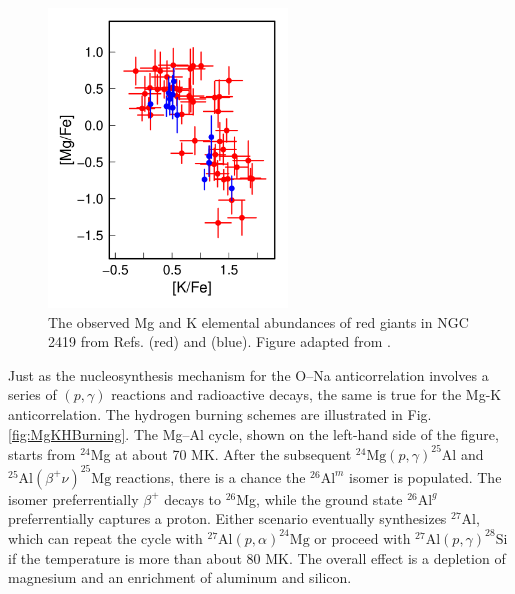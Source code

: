\begin{figure}[t]
\centering
\includegraphics[width=2.5in]{Chapter-6/figs/MgK_Observation.png}
\caption{\label{fig:MgK}The observed Mg and K elemental abundances of red giants in NGC 2419 from Refs. \cite{Mucciarelli2012} (red) and \cite{Cohen2012} (blue). Figure adapted from \cite{Iliadis2016}.}
\end{figure}


Just as the nucleosynthesis mechanism for the O--Na anticorrelation involves a series of $(p,\gamma)$ reactions and radioactive decays, the same is true for the Mg-K anticorrelation. The hydrogen burning schemes are illustrated in Fig. \ref{fig:MgKHBurning}. The Mg--Al cycle, shown on the left-hand side of the figure, starts from $^{24}$Mg at about 70 MK. After the subsequent $^{24}\mathrm{Mg}(p,\gamma)^{25}\mathrm{Al}$ and $^{25}\mathrm{Al}(\beta^{+}\nu)^{25}\mathrm{Mg}$ reactions, there is a chance the $^{26}\mathrm{Al}^{m}$ isomer is populated. The isomer preferrentially $\beta^{+}$ decays to $^{26}$Mg, while the ground state $^{26}\mathrm{Al}^{g}$ preferrentially captures a proton. Either scenario eventually synthesizes $^{27}$Al, which can repeat the cycle with $^{27}\mathrm{Al}(p,\alpha)^{24}\mathrm{Mg}$ or proceed with $^{27}\mathrm{Al}(p,\gamma)^{28}\mathrm{Si}$ if the temperature is more than about 80 MK. The overall effect is a depletion of magnesium and an enrichment of aluminum and silicon.


